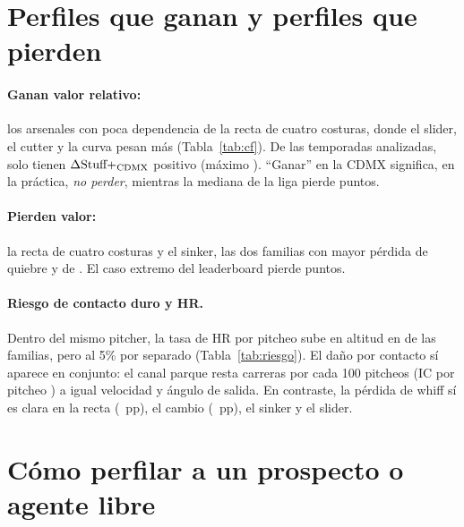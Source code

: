 \documentclass[10pt]{article}
\begin{document}
\section{Perfiles que ganan y perfiles que pierden}

\paragraph{Ganan valor relativo:} los arsenales con poca dependencia de la recta de cuatro costuras, donde el slider, el cutter y la curva pesan más (Tabla~\ref{tab:cf}). De las  temporadas analizadas, solo  tienen $\Delta\text{Stuff+}_{\text{CDMX}}$ positivo (máximo ). ``Ganar'' en la CDMX significa, en la práctica, \emph{no perder}, mientras la mediana de la liga pierde  puntos.

\paragraph{Pierden valor:} la recta de cuatro costuras y el sinker, las dos familias con mayor pérdida de quiebre y de \splus. El caso extremo del leaderboard pierde  puntos.

\paragraph{Riesgo de contacto duro y HR.} Dentro del mismo pitcher, la tasa de HR por pitcheo sube en altitud en  de las  familias, pero  al 5\% por separado (Tabla~\ref{tab:riesgo}). El daño por contacto sí aparece en conjunto: el canal parque resta  carreras por cada 100 pitcheos (IC por pitcheo ) a igual velocidad y ángulo de salida. En contraste, la pérdida de whiff sí es clara en la recta (~pp), el cambio (~pp), el sinker y el slider.

\begin{table}[H]\centering\small
\caption{Riesgo por familia en \emph{Extreme} frente a \emph{No Altitude} (dentro del mismo pitcher, en puntos porcentuales por pitcheo).}\label{tab:riesgo}
\end{table}

\section{Cómo perfilar a un prospecto o agente libre}
\end{document}
